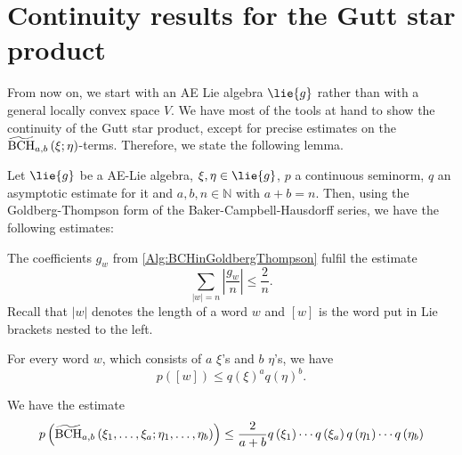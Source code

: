 \section{Continuity results for the Gutt star product}
\label{sec:chap5_TopologyStar}

From now on, we start with an AE Lie algebra $\lie{g}$ rather than with a 
general locally convex space $V$. We have most of the tools at hand to show the 
continuity of the Gutt star product, except for precise estimates on the 
$\widetilde{\mathrm{BCH}}_{a, b}\left(\xi; \eta\right)$-terms. Therefore, we state the following lemma.
\begin{lemma}
	\label{LCAna:Lemma:BCHTermsEstiamte}
	Let $\lie{g}$ be a AE-Lie algebra, $\xi, \eta \in \lie{g}$, $p$ a 
	continuous seminorm, $q$ an	asymptotic estimate for it and $a, b, n \in 
	\mathbb{N}$ with $a + b = n$. Then, using the Goldberg-Thompson form of 
	the Baker-Campbell-Hausdorff series, we have the following estimates:
	\begin{lemmalist}
	  \item \label{Item:ThompsonEstimate}
		The coefficients $g_w$ from \eqref{Alg:BCHinGoldbergThompson} 
		fulfil the estimate
		\begin{equation}
			\label{LCAna:ThompsonEstimate}
			\sum\limits_{|w| = n}
			\left| \frac{g_w}{n} \right|
			\leq
			\frac{2}{n}.
		\end{equation}
		Recall that $|w|$ denotes the length of a word $w$ and $[w]$ is the
		word put in Lie brackets nested to  the left.
	\item \label{Item:AEonWords}
		For every word $w$, which consists of $a$ $\xi$'s and $b$ $\eta$'s,
		we have
		\begin{equation}
		\label{LCAna:AEonWords}
			p([w])
			\leq
			q(\xi)^a q(\eta)^b.
		\end{equation}
	\item \label{Item:BCHEstimate}
		We have the estimate
		\begin{equation}
		\label{LCAna:BCHEstimate}
			p \left(
				\widetilde{\mathrm{BCH}}_{a, b}\left(\xi_1, \ldots, \xi_a; \eta_1, \ldots, \eta_b\right)
			\right)
			\leq
			\frac{2}{a + b}
			q\left( \xi_1 \right) \cdots q\left( \xi_a \right)
			q\left( \eta_1 \right) \cdots q\left( \eta_b \right)
		\end{equation}
	\end{lemmalist}
\end{lemma}
